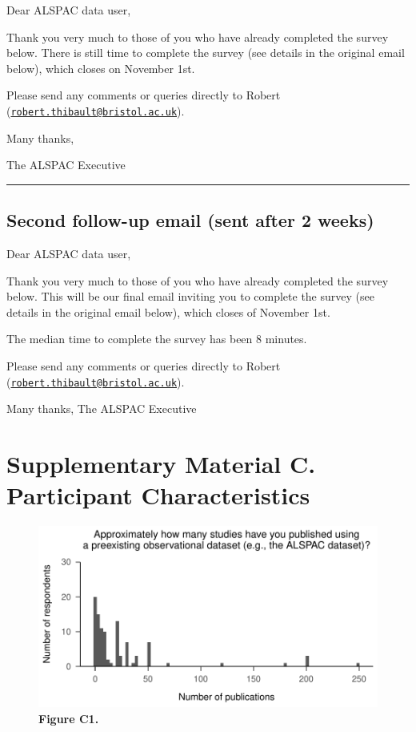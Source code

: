 \documentclass[
  man,floatsintext]{apa6}
\begin{document}
Dear ALSPAC data user,

Thank you very much to those of you who have already completed the survey below.
There is still time to complete the survey (see details in the original email below), which closes on November 1st.

Please send any comments or queries directly to Robert (\href{mailto:robert.thibault@bristol.ac.uk}{\nolinkurl{robert.thibault@bristol.ac.uk}}).

Many thanks,

The ALSPAC Executive

\begin{center}\rule{0.5\linewidth}{0.5pt}\end{center}

\hypertarget{second-follow-up-email-sent-after-2-weeks}{%
\subsection{Second follow-up email (sent after 2 weeks)}\label{second-follow-up-email-sent-after-2-weeks}}

Dear ALSPAC data user,

Thank you very much to those of you who have already completed the survey below.
This will be our final email inviting you to complete the survey (see details in the original email below), which closes of November 1st.

The median time to complete the survey has been 8 minutes.

Please send any comments or queries directly to Robert (\href{mailto:robert.thibault@bristol.ac.uk}{\nolinkurl{robert.thibault@bristol.ac.uk}}).

Many thanks,
The ALSPAC Executive

\pagebreak

\hypertarget{supplementary-material-c.-participant-characteristics}{%
\section{Supplementary Material C. Participant Characteristics}\label{supplementary-material-c.-participant-characteristics}}

\begin{figure}

{\centering \includegraphics[width=1\linewidth]{figs/numStudiesPlot-1} 

}

\caption{\textbf{Figure C1.}}\label{fig:numStudiesPlot}
\end{figure}
\end{document}
